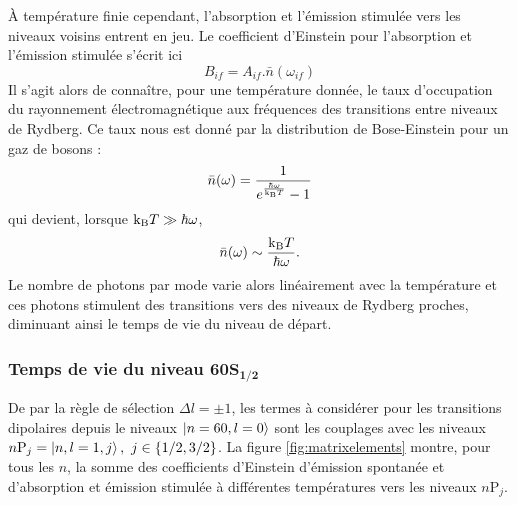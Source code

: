 \`A température finie cependant, l'absorption et l'émission stimulée vers les niveaux voisins entrent en jeu.
Le coefficient d'Einstein pour l'absorption et  l'émission stimulée s'écrit ici
\begin{equation}\label{eq:EinsteinBif}
B_{if} = A_{if} . \bar{n}(\omega_{if})
\end{equation}
Il s'agit alors de connaître, pour une température donnée, le taux d'occupation du rayonnement électromagnétique aux fréquences des transitions entre niveaux de Rydberg.
Ce taux nous est donné par la distribution de Bose-Einstein pour un gaz de bosons \cite{TXT_GORECKIPHYSTAT} :
\begin{equation}\label{eq:BoseStat}
\bar{n}(\omega) = \frac{1}{e^{\frac{\hbar\omega}{\mathrm{k_B} T}}-1}
\end{equation}
qui devient, lorsque $\mathrm{k_B} T \gg \hbar\omega$,
\begin{equation}\label{eq:BoseStat_blackbody}
\bar{n}(\omega) \sim \frac{\mathrm{k_B} T}{\hbar\omega}.
\end{equation}
Le nombre de photons par mode varie alors linéairement avec la température et ces photons stimulent des transitions vers des niveaux de Rydberg proches, diminuant ainsi le temps de vie du niveau de départ.




\subsubsection*{Temps de vie du niveau $\mathbf{60S_{1/2}}$}
De par la règle de sélection $\Delta l=\pm1$, les termes à considérer pour les transitions dipolaires depuis le niveaux $\ket{n=60,l=0}$ sont les couplages avec les niveaux $n\mathrm{P}_j = \ket{n,l=1,j},~j\in\{1/2,3/2\}$.
La figure \eqref{fig:matrixelements} montre, pour tous les $n$, la somme des coefficients d'Einstein d'émission spontanée et d'absorption et émission stimulée à différentes températures vers les niveaux $n\mathrm{P}_j$.

